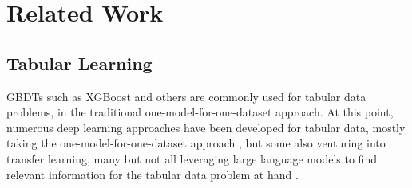 \section{Related Work}
\label{sec:related-work}

\subsection{Tabular Learning}


GBDTs such as XGBoost and others \citep{chen2016xgboost, prokhorenkova2018catboost, ke2017lightgbm} are commonly used for tabular data problems, in the traditional one-model-for-one-dataset approach. At this point, numerous deep learning approaches have been developed for tabular data, mostly taking the one-model-for-one-dataset approach \citep{borisov2022deep, somepalli2021saint, grinsztajn2022tree, gorishniy2021revisiting, rubachev2022revisiting, kadra2021well, arik2021tabnet, popov2019neural, arik2021tabnet, kotelnikov2023tabddpm, gorishniy2024tabr, gorishniy2022embeddings, 10.1145/3637528.3671893, kadra2021welltuned, huang2020tabtransformertabulardatamodeling}, but some also venturing into transfer learning, many but not all leveraging large language models to find relevant information for the tabular data problem at hand \citep{levin2022transfer, yan2024making, borisov2023language, ye2024towards, spinaci2024portal, pmlr-v206-hegselmann23a, kim2024carte, zhu2023xtab}.










